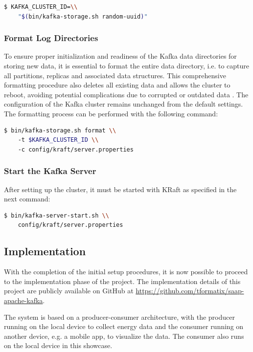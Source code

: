 \begin{lstlisting}[language=bash]
$ KAFKA_CLUSTER_ID=\\
    "$(bin/kafka-storage.sh random-uuid)"
\end{lstlisting}

\subsubsection{Format Log Directories} To ensure proper initialization and readiness of the Kafka data directories for storing new data, it is essential to format the entire data directory, i.e. to capture all partitions, replicas and associated data structures. This comprehensive formatting procedure also deletes all existing data and allows the cluster to reboot, avoiding potential complications due to corrupted or outdated data \cite{shapira2021kafka}. The configuration of the Kafka cluster remains unchanged from the default settings. The formatting process can be performed with the following command:

\begin{lstlisting}[language=bash]
$ bin/kafka-storage.sh format \\
    -t $KAFKA_CLUSTER_ID \\
    -c config/kraft/server.properties
\end{lstlisting}

\subsubsection{Start the Kafka Server} After setting up the cluster, it must be started with KRaft as specified in the next command:

\begin{lstlisting}[language=bash]
$ bin/kafka-server-start.sh \\
    config/kraft/server.properties
\end{lstlisting}

\subsection{Implementation}

With the completion of the initial setup procedures, it is now possible to proceed to the implementation phase of the project. The implementation details of this project are publicly available on GitHub at \url{https://github.com/tformatix/saap-apache-kafka}.

The system is based on a producer-consumer architecture, with the producer running on the local device to collect energy data and the consumer running on another device, e.g. a mobile app, to visualize the data. The consumer also runs on the local device in this showcase.

